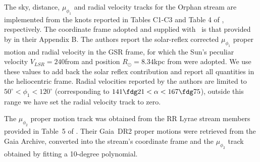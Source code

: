 The sky, distance, $\mu_{\phi_1}$ and radial velocity tracks for the Orphan stream are implemented from the knots
reported in Tables C1-C3 and Table 4 of \citet{Koposov2019}, respectively. 
The coordinate frame adopted and supplied with \galstreams\ is that provided by \citet{Koposov2019} in their Appendix B.
The authors report the solar-reflex corrected $\mu_{\phi_1}$ proper motion and radial velocity in the GSR frame,
for which the Sun's peculiar velocity $V_{LSR}=240$\kms from \citet{Schoenrich2010} and position $R_\odot=8.34$kpc 
from \citet{Reid2014} were adopted. We use these values to add back the solar reflex contribution and report all quantities in the heliocentric frame. Radial velocities reported by the authors are limited to $50^\circ<\phi_1<120^\circ$ (corresponding to 
$141\fdg21<\alpha<167\fdg75$), outside this range we have set the radial velocity track to zero.

The $\mu_{\phi_2}$ proper motion track was obtained from the RR Lyrae stream members provided in Table~5 of \citet{Koposov2019}. Their Gaia~DR2 \citep{GaiaCol_2018_DR2_survey} proper motions were retrieved from the Gaia Archive, converted into the stream's coordinate frame and the 
$\mu_{\phi_2}$ track obtained by fitting a 10-degree polynomial. 
